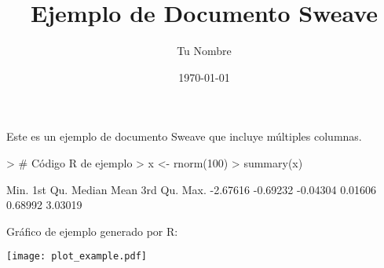 \documentclass{article}
\begin{document}


\title{Ejemplo de Documento Sweave}
\author{Tu Nombre}
\date{\today}

\maketitle

\begin{multicols}{2}
Este es un ejemplo de documento Sweave que incluye múltiples columnas.

\begin{Schunk}
\begin{Sinput}
> # Código R de ejemplo
> x <- rnorm(100)
> summary(x)
\end{Sinput}
\begin{Soutput}
    Min.  1st Qu.   Median     Mean  3rd Qu.     Max. 
-2.67616 -0.69232 -0.04304  0.01606  0.68992  3.03019 
\end{Soutput}
\end{Schunk}

Gráfico de ejemplo generado por R:

\texttt{[image: plot\_example.pdf]}

\end{multicols}
\end{document}
